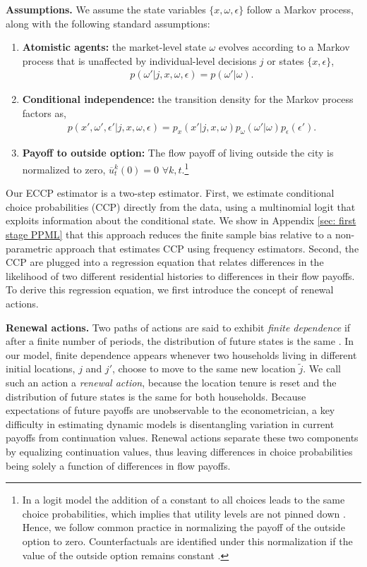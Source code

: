 \documentclass[11pt]{article}
\newcommand{\Paragraph}{\vspace{0.1cm}\noindent\textbf}
\begin{document}
\Paragraph{Assumptions.} We assume the state variables $\{x, \omega, \epsilon\}$ follow a Markov process, along with the following standard assumptions:
\begin{enumerate}
    \item \textbf{Atomistic agents:} the market-level state $\omega$ evolves according to a Markov process that is unaffected by individual-level decisions $j$ or states $\{x, \epsilon\}$,
        \begin{align*}
            p(\omega'|j, x,\omega, \epsilon)=p(\omega'|\omega).
        \end{align*}
    \item \textbf{Conditional independence:} the transition density for the Markov process factors as,
        \begin{align*}
            p(x', \omega',\epsilon'| j, x, \omega, \epsilon)= p_x(x'|j,x, \omega)p_\omega(\omega'|\omega)p_\epsilon(\epsilon').
        \end{align*}
    \item \textbf{Payoff to outside option:} The flow payoff of living outside the city is normalized to zero, $\overline{u}^k_t(0)=0 \, \, \forall k, t.$\footnote{In a logit model the addition of a constant to all choices leads to the same choice probabilities, which implies that utility levels are not pinned down \citep{train}. Hence, we follow common practice in normalizing the payoff of the outside option to zero. Counterfactuals are identified under this normalization if the value of the outside option remains constant \citep{kalouptsidi2021identification}.}
\end{enumerate}
Our ECCP estimator is a two-step estimator. First, we estimate conditional choice probabilities (CCP) directly from the data, using a multinomial logit that exploits information about the conditional state. We show in Appendix \ref{sec: first stage PPML} that this approach reduces the finite sample bias relative to a non-parametric approach that estimates CCP using frequency estimators. Second, the CCP are plugged into a regression equation that relates differences in the likelihood of two different residential histories to differences in their flow payoffs. To derive this regression equation, we first introduce the concept of renewal actions.

\Paragraph{Renewal actions.} 
Two paths of actions are said to exhibit \textit{finite dependence} if after a finite number of periods, the distribution of future states is the same \citep{arcidiacono2011conditional}. In our model, finite dependence appears whenever two households living in different initial locations, $j$ and $j'$, choose to move to the same new location $\tilde{j}$. We call such an action a \textit{renewal action}, because the location tenure is reset and the distribution of future states is the same for both households. Because expectations of future payoffs are unobservable to the econometrician, a key difficulty in estimating dynamic models is disentangling variation in current payoffs from continuation values. Renewal actions separate these two components by equalizing continuation values, thus leaving differences in choice probabilities being solely a function of differences in flow payoffs. 
\end{document}
